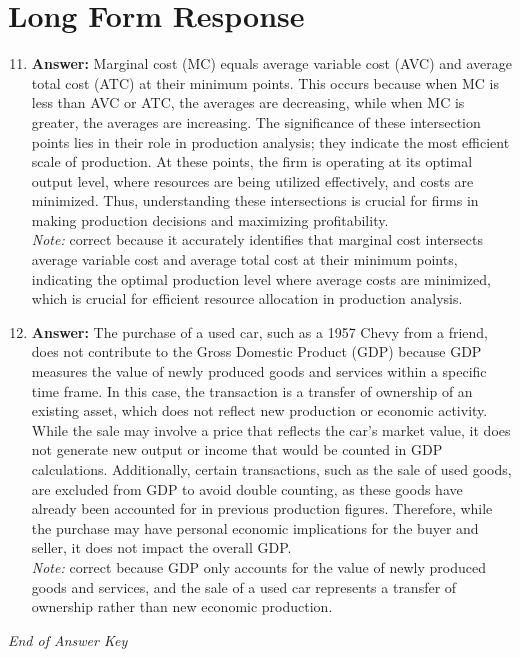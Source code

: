 \documentclass[12pt]{article}
\begin{document}
\section*{Long Form Response}
\begin{enumerate}[label=\arabic*.]
\setcounter{enumi}{10}
\item \textbf{Answer:} Marginal cost (MC) equals average variable cost (AVC) and average total cost (ATC) at their minimum points. This occurs because when MC is less than AVC or ATC, the averages are decreasing, while when MC is greater, the averages are increasing. The significance of these intersection points lies in their role in production analysis; they indicate the most efficient scale of production. At these points, the firm is operating at its optimal output level, where resources are being utilized effectively, and costs are minimized. Thus, understanding these intersections is crucial for firms in making production decisions and maximizing profitability.
\\ \textit{Note:} correct because it accurately identifies that marginal cost intersects average variable cost and average total cost at their minimum points, indicating the optimal production level where average costs are minimized, which is crucial for efficient resource allocation in production analysis.
\item \textbf{Answer:} The purchase of a used car, such as a 1957 Chevy from a friend, does not contribute to the Gross Domestic Product (GDP) because GDP measures the value of newly produced goods and services within a specific time frame. In this case, the transaction is a transfer of ownership of an existing asset, which does not reflect new production or economic activity. While the sale may involve a price that reflects the car's market value, it does not generate new output or income that would be counted in GDP calculations. Additionally, certain transactions, such as the sale of used goods, are excluded from GDP to avoid double counting, as these goods have already been accounted for in previous production figures. Therefore, while the purchase may have personal economic implications for the buyer and seller, it does not impact the overall GDP.
\\ \textit{Note:} correct because GDP only accounts for the value of newly produced goods and services, and the sale of a used car represents a transfer of ownership rather than new economic production.
\end{enumerate}

\vfill
\noindent\textit{End of Answer Key}
\end{document}
